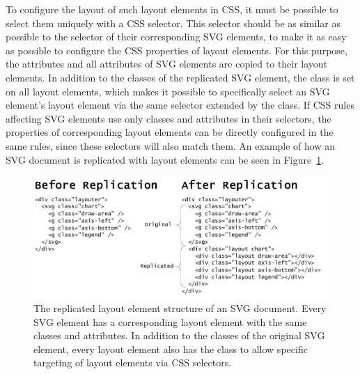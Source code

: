 To configure the layout of such layout elements in CSS, it must be
possible to select them uniquely with a CSS selector. This selector
should be as similar as possible to the selector of their
corresponding SVG elements, to make it as easy as possible to
configure the CSS properties of layout elements. For this purpose, the
 attributes and all  attributes of SVG
elements are copied to their layout elements. In addition to the
classes of the replicated SVG element, the  class is set
on all layout elements, which makes it possible to specifically select
an SVG element's layout element via the same selector extended by the
 class. If CSS rules affecting SVG elements use only
classes and  attributes in their selectors, the
properties of corresponding layout elements can be directly configured
in the same rules, since these selectors will also match them. An
example of how an SVG document is replicated with 
layout elements can be seen in Figure~\ref{fig:LayouterReplication}.

\begin{figure}[tp]
\centering
\includegraphics[keepaspectratio,width=\linewidth,height=\thirdh]
{diagrams/respvis-layouter-replication.pdf}
\caption[Replication of an SVG Document via Layouter]{%
The replicated layout element structure of an SVG document. Every SVG
element has a corresponding layout element with the same classes
and  attributes. In addition to the classes of the
original SVG element, every layout element also has the 
class to allow specific targeting of layout elements via CSS
selectors.
}
\label{fig:LayouterReplication}
\end{figure}


